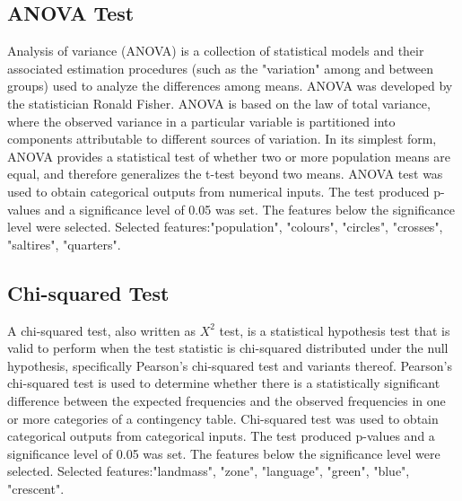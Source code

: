 \documentclass[conference]{IEEEtran}
\begin{document}
\subsection{ANOVA Test}
Analysis of variance (ANOVA) is a collection of statistical models and their associated estimation procedures (such as the "variation" among and between groups) used to analyze the differences among means. ANOVA was developed by the statistician Ronald Fisher. ANOVA is based on the law of total variance, where the observed variance in a particular variable is partitioned into components attributable to different sources of variation. In its simplest form, ANOVA provides a statistical test of whether two or more population means are equal, and therefore generalizes the t-test beyond two means.\cite{b3} ANOVA test was used to obtain categorical outputs from numerical inputs. The test produced p-values and a significance level of 0.05 was set. The features below the significance level were selected.
Selected features:"population", "colours", "circles", "crosses", "saltires", "quarters".

\subsection{Chi-squared Test}
A chi-squared test, also written as $X^2$ test, is a statistical hypothesis test that is valid to perform when the test statistic is chi-squared distributed under the null hypothesis, specifically Pearson's chi-squared test and variants thereof. Pearson's chi-squared test is used to determine whether there is a statistically significant difference between the expected frequencies and the observed frequencies in one or more categories of a contingency table.\cite{b4} Chi-squared test was used to obtain categorical outputs from categorical inputs. The test produced p-values and a significance level of 0.05 was set. The features below the significance level were selected.
Selected features:"landmass", "zone", "language", "green", "blue", "crescent".
\end{document}
